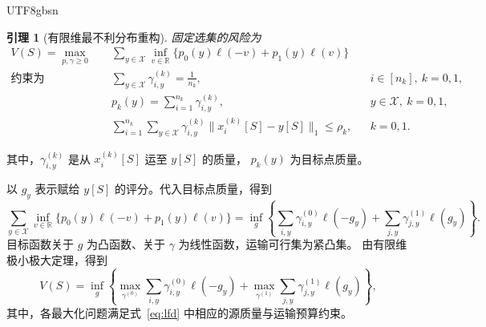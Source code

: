 \documentclass[11pt,a4paper]{article}
\theoremstyle{plain}
\newtheorem{lemma}[proposition]{引理}
\begin{document}
\begin{CJK*}{UTF8}{gbsn}
\begin{lemma}[有限维最不利分布重构]\label{prop:lfd}
固定选集的风险为
\begin{equation}\label{eq:lfd}
\begin{aligned}
V(S)=\max_{p,\gamma\ge0}\quad&
\sum_{y\in\mathcal X}\inf_{v\in\mathbb R}
\{p_0(y)\ell(-v)+p_1(y)\ell(v)\}\\
\text{约束为}\quad&
\sum_{y\in\mathcal X}\gamma_{i,y}^{(k)}=\frac1{n_k},
&&i\in[n_k],\ k=0,1,\\
&p_k(y)=\sum_{i=1}^{n_k}\gamma_{i,y}^{(k)},
&&y\in\mathcal X,\ k=0,1,\\
&\sum_{i=1}^{n_k}\sum_{y\in\mathcal X}
\gamma_{i,y}^{(k)}\|x_i^{(k)}[S]-y[S]\|_1\le\rho_k,
&&k=0,1.
\end{aligned}
\end{equation}
\end{lemma}

其中，$\gamma_{i,y}^{(k)}$ 是从 $x_i^{(k)}[S]$ 运至 $y[S]$ 的质量，
$p_k(y)$ 为目标点质量。

以 $g_y$ 表示赋给 $y[S]$ 的评分。代入目标点质量，得到
\[
\sum_{y\in\mathcal X}\inf_{v\in\mathbb R}
\{p_0(y)\ell(-v)+p_1(y)\ell(v)\}
=\inf_g\left\{
\sum_{i,y}\gamma_{i,y}^{(0)}\ell(-g_y)
+\sum_{j,y}\gamma_{j,y}^{(1)}\ell(g_y)\right\}.
\]
目标函数关于 $g$ 为凸函数、关于 $\gamma$ 为线性函数，运输可行集为紧凸集。
由有限维极小极大定理，得到
\[
V(S)=\inf_g\left\{
\max_{\gamma^{(0)}}\sum_{i,y}\gamma_{i,y}^{(0)}\ell(-g_y)
+\max_{\gamma^{(1)}}\sum_{j,y}\gamma_{j,y}^{(1)}\ell(g_y)
\right\},
\]
其中，各最大化问题满足式~\eqref{eq:lfd} 中相应的源质量与运输预算约束。


\end{CJK*}
\end{document}
